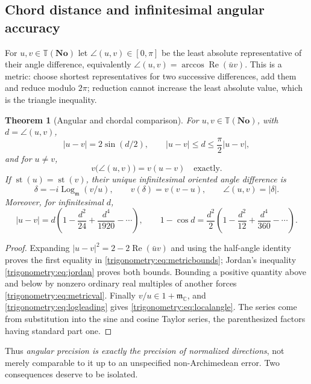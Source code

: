 \documentclass[11pt,letterpaper]{article}
\numberwithin{equation}{section}
\newtheorem{theorem}{Theorem}[section]
\theoremstyle{definition}
\theoremstyle{remark}
\newcommand{\No}{\mathbf{No}}
\newcommand{\C}{\mathbb C}
\newcommand{\mm}{\mathfrak m}
\newcommand{\TT}{\mathbb T}
\newcommand{\st}{\operatorname{st}}
\newcommand{\re}{\operatorname{Re}}
\newcommand{\Logm}{\operatorname{Log}_{\mm}}
\newcommand{\ang}[2]{\angle(#1,#2)}
\begin{document}
\subsection{Chord distance and infinitesimal angular accuracy}
For $u,v\in\TT(\No)$ let $\ang uv\in[0,\pi]$ be the least absolute representative of their angle
difference, equivalently $\ang uv=\arccos\re(\bar uv)$. This is a metric: choose shortest
representatives for two successive differences, add them and reduce modulo $2\pi$; reduction cannot
increase the least absolute value, which is the triangle inequality.

\begin{theorem}[Angular and chordal comparison]\label{trigonometry:thm:metric}
For $u,v\in\TT(\No)$, with $d=\ang uv$,
\begin{equation}\label{trigonometry:eq:metricbounds}
 |u-v|=2\sin(d/2),\qquad |u-v|\le d\le\frac\pi2|u-v|,
\end{equation}
and for $u\ne v$,
\begin{equation}\label{trigonometry:eq:metricval}
 v\bigl(\ang uv\bigr)=v(u-v)\quad\text{exactly.}
\end{equation}
If $\st(u)=\st(v)$, their unique infinitesimal oriented angle difference is
\begin{equation}\label{trigonometry:eq:localangle}
 \delta=-i\Logm(v/u),\qquad v(\delta)=v(v-u),\qquad \ang uv=|\delta| .
\end{equation}
Moreover, for infinitesimal $d$,
\begin{equation}\label{trigonometry:eq:chordseries}
 |u-v|=d\left(1-\frac{d^2}{24}+\frac{d^4}{1920}-\cdots\right),\qquad
 1-\cos d=\frac{d^2}2\left(1-\frac{d^2}{12}+\frac{d^4}{360}-\cdots\right).
\end{equation}
\end{theorem}
\begin{proof}
Expanding $|u-v|^2=2-2\re(\bar uv)$ and using the half-angle identity proves the first equality in
\cref{trigonometry:eq:metricbounds}; Jordan's inequality \cref{trigonometry:eq:jordan} proves both
bounds. Bounding a positive quantity above and below by nonzero ordinary real multiples of another
forces \cref{trigonometry:eq:metricval}. Finally $v/u\in1+\mm_{\C}$, and
\cref{trigonometry:eq:logleading} gives \cref{trigonometry:eq:localangle}. The series come from
substitution into the sine and cosine Taylor series, the parenthesized factors having standard part
one.
\end{proof}
Thus \emph{angular precision is exactly the precision of normalized directions}, not merely
comparable to it up to an unspecified non-Archimedean error. Two consequences deserve to be
isolated.
\end{document}
